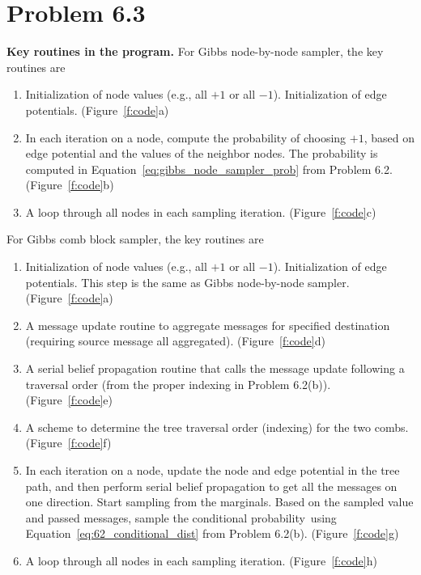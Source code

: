 \documentclass{article}
\begin{document}
\section*{Problem 6.3}
%
\textbf{Key routines in the program.}
%
\noindent
For Gibbs node-by-node sampler, the key routines are 
\begin{enumerate}
	\item Initialization of node values (e.g., all $+1$ or all $-1$). Initialization of edge potentials. (Figure~\ref{f:code}a)
	\item In each iteration on a node, compute the probability of choosing $+1$, based on edge potential
	  	  and the values of the neighbor nodes. The probability is computed
	  	  in Equation~\eqref{eq:gibbs_node_sampler_prob} from Problem 6.2. (Figure~\ref{f:code}b)
	\item A loop through all nodes in each sampling iteration. (Figure~\ref{f:code}c)
\end{enumerate}
%
For Gibbs comb block sampler, the key routines are
\begin{enumerate}
	\item Initialization of node values (e.g., all $+1$ or all $-1$). Initialization of edge potentials. This
	      step is the same as Gibbs node-by-node sampler. (Figure~\ref{f:code}a)
	\item A message update routine to aggregate messages for specified destination (requiring source message all aggregated). 
	      (Figure~\ref{f:code}d)
	\item A serial belief propagation routine that calls the message update following a traversal order
	      (from the proper indexing in Problem 6.2(b)). (Figure~\ref{f:code}e)
	\item A scheme to determine the tree traversal order (indexing) for the two combs. (Figure~\ref{f:code}f)
	\item In each iteration on a node, update the node and edge potential in the tree path, and then
	      perform serial belief propagation to get all the messages on one direction.
	      Start sampling from the marginals. Based on the sampled value and passed messages,
	      sample the conditional probability using Equation~\eqref{eq:62_conditional_dist} from Problem 6.2(b). (Figure~\ref{f:code}g)
	\item A loop through all nodes in each sampling iteration. (Figure~\ref{f:code}h)
\end{enumerate}
\end{document}
